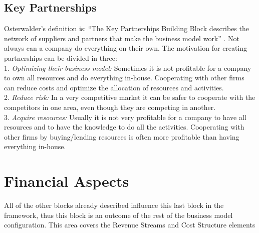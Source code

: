 \subsection{Key Partnerships}
Osterwalder’s definition is: “The Key Partnerships Building Block describes the network of suppliers and partners that make the business model work” \cite{osterwalder}. Not always can a company do everything on their own. The motivation for creating partnerships can be divided in three: 
\\
1. \emph{Optimizing their business model:} Sometimes it is not profitable for a company to own all resources and do everything in-house. Cooperating with other firms can reduce costs and optimize the allocation of resources and activities. 
\\
2. \emph{Reduce risk:} In a very competitive market it can be safer to cooperate with the competitors in one area, even though they are competing in another.
\\
3. \emph{Acquire resources:} Usually it is not very profitable for a company to have all resources and to have the knowledge to do all the activities. Cooperating with other firms by buying/lending resources is often more profitable than having everything in-house. 

\section{Financial Aspects}
All of the other blocks already described influence this last block in the framework, thus this block is an outcome of the rest of the business model configuration. This area covers the Revenue Streams and Cost Structure elements \cite{osterwalderthesis}

